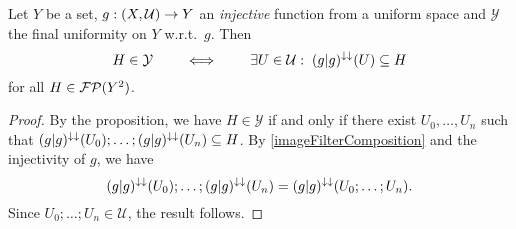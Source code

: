 \begin{corollary} \label{finalUniformityWrtInjectiveFunction}
Let $Y$ be a set, $g: \sSet{X, \mathcal{U}} \to Y$ an \emph{injective} function from a uniform space and $\mathcal{Y}$ the final uniformity on $Y$ w.r.t.\ $g$. Then
\[ H \in \mathcal{Y} \qquad\iff\qquad \exists U\in\mathcal{U}: \; (g|g)^{\downarrow\downarrow}(U) \subseteq H \]
for all $H\in\operatorname{\mathcal{FP}}(Y^2)$.
\end{corollary}
\begin{proof}
By the proposition, we have $H \in \mathcal{Y}$ if and only if there exist $U_0, \ldots, U_n$ such that $(g|g)^{\downarrow\downarrow}(U_0);\ldots;(g|g)^{\downarrow\downarrow}(U_n) \subseteq H$. By \ref{imageFilterComposition} and the injectivity of $g$, we have
\[ (g|g)^{\downarrow\downarrow}(U_0);\ldots;(g|g)^{\downarrow\downarrow}(U_n) = (g|g)^{\downarrow\downarrow}(U_0;\ldots; U_n). \]
Since $U_0;\ldots; U_n\in\mathcal{U}$, the result follows.
\end{proof}

